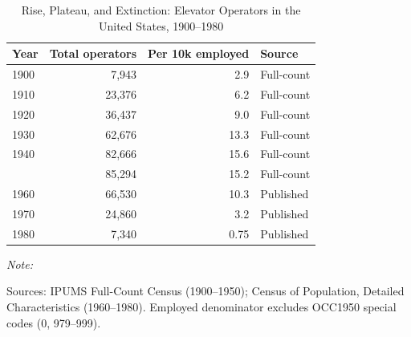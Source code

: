\begin{table}[!h]
\centering
\caption{Rise, Plateau, and Extinction: Elevator Operators in the United States, 1900--1980}
\centering
\begin{threeparttable}
\begin{tabular}[t]{lrrl}
\toprule
Year & Total operators & Per 10k employed & Source\\
\midrule
1900 & 7,943 & 2.9 & Full-count\\
1910 & 23,376 & 6.2 & Full-count\\
1920 & 36,437 & 9.0 & Full-count\\
1930 & 62,676 & 13.3 & Full-count\\
1940 & 82,666 & 15.6 & Full-count\\
\addlinespace
1950 & 85,294 & 15.2 & Full-count\\
1960 & 66,530 & 10.3 & Published\\
1970 & 24,860 & 3.2 & Published\\
1980 & 7,340 & 0.75 & Published\\
\bottomrule
\end{tabular}
\begin{tablenotes}
\item \textit{Note: } 
\item Sources: IPUMS Full-Count Census (1900--1950); Census of Population, Detailed Characteristics (1960--1980). Employed denominator excludes OCC1950 special codes (0, 979--999).
\end{tablenotes}
\end{threeparttable}
\end{table}
